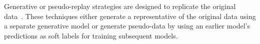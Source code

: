 
Generative or pseudo-replay strategies are designed to replicate the original data~\cite{lwf,gr,BIR, malcl}. These techniques either generate a representative of the original data using a separate generative model or generate pseudo-data by using an earlier model's predictions as soft labels for training subsequent models. 




